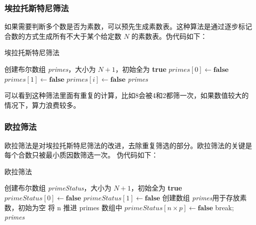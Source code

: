 \subsubsection{埃拉托斯特尼筛法}
如果需要判断多个数是否为素数，可以预先生成素数表。这种算法是通过逐步标记合数的方式生成所有不大于某个给定数 \( N \) 的素数表。伪代码如下：
\begin{algorithm}
	\caption{埃拉托斯特尼筛法}
	\label{algo:SieveOfEratosthenes}
	\begin{algorithmic}[1]
		\State 创建布尔数组 \textit{primes}，大小为 \( N+1 \)，初始全为 \textbf{true}
		\State \( \textit{primes}[0] \gets \textbf{false} \)
		\State \( \textit{primes}[1] \gets \textbf{false} \) 
		\State \( \textit{primes}[i] \gets \textbf{false} \)
		\EndFor
		\EndIf
		\EndFor
		\Return \textit{primes}
		\EndFunction
	\end{algorithmic}
\end{algorithm}

可以看到这种筛法里面有重复的计算，比如8会被4和2都筛一次，如果数值较大的情况下，算力浪费较多。

\subsubsection{欧拉筛法}
欧拉筛法是对埃拉托斯特尼筛法的改进，去除重复筛选的部分。欧拉筛法的关键是每个合数只被最小质因数筛选一次。
伪代码如下：
\begin{algorithm}
	\caption{欧拉筛法}
	\label{algo:SieveOfEuler}
	\begin{algorithmic}[1]
		\State 创建布尔数组 \textit{primeStatus}，大小为 \( N+1 \)，初始全为 \textbf{true}
		\State \( \textit{primeStatus}[0] \gets \textbf{false} \)
		\State \( \textit{primeStatus}[1] \gets \textbf{false} \) 
		\State 创建数组 \textit{primes}用于存放素数，初始为空
		\State 将 n 推进 primes 数组中
		\EndIf
		\State \(  {primeStatus[n \times p] \gets \textbf{false}}\)
		 
		\State break;
		\EndIf
		\EndFor
		\EndFor
		\Return \textit{primes}
		\EndFunction
	\end{algorithmic}
\end{algorithm}

